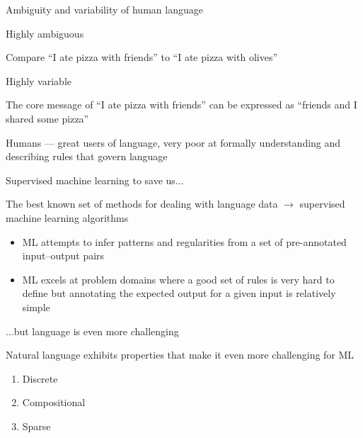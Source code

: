 \documentclass[12pt,aspectratio=169,handout]{beamer}
\begin{document}
\begin{frame}{Ambiguity and variability of human language}

Highly ambiguous
\begin{example}
Compare ``I ate pizza with friends'' to ``I ate pizza with olives''
\end{example}


Highly variable
\begin{example}
The core message of ``I ate pizza with friends'' can be expressed as
``friends and I shared some pizza''
\end{example}

Humans --- great users of language, very poor at formally understanding and describing rules that govern language


	
\end{frame}




\begin{frame}{Supervised machine learning to save us...}
	
The best known set of methods for dealing with language data $\to$ supervised machine learning algorithms
\begin{itemize}
	\item ML attempts to infer patterns and regularities from a set of pre-annotated input--output pairs
	\item ML excels at problem domains where a good set of rules is very hard to
	define but annotating the expected output for a given input is relatively simple
\end{itemize}

\end{frame}


\begin{frame}{...but language is even more challenging}

Natural language exhibits properties that make it even more challenging for ML

\begin{enumerate}
	\item Discrete
	\item Compositional
	\item Sparse
\end{enumerate}

\end{frame}
\end{document}
